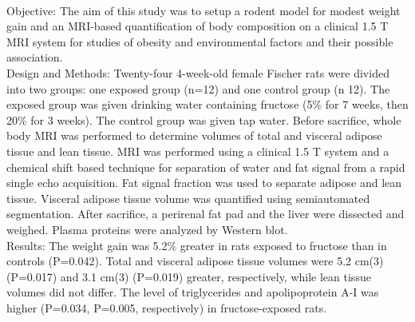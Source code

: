 {{\begin{enumerate}
\\ \aabstract
Objective: The aim of this study was to setup a rodent model for modest weight gain and an MRI-based quantification of body composition on a clinical 1.5 T MRI system for studies of obesity and environmental factors and their possible association.\\ Design and Methods: Twenty-four 4-week-old female Fischer rats were divided into two groups: one exposed group (n=12) and one control group (n 12). The exposed group was given drinking water containing fructose (5\% for 7 weeks, then 20\% for 3 weeks). The control group was given tap water. Before sacrifice, whole body MRI was performed to determine volumes of total and visceral adipose tissue and lean tissue. MRI was performed using a clinical 1.5 T system and a chemical shift based technique for separation of water and fat signal from a rapid single echo acquisition. Fat signal fraction was used to separate adipose and lean tissue. Visceral adipose tissue volume was quantified using semiautomated segmentation. After sacrifice, a perirenal fat pad and the liver were dissected and weighed. Plasma proteins were analyzed by Western blot. \\
Results: The weight gain was 5.2\% greater in rats exposed to fructose than in controls (P=0.042). Total and visceral adipose tissue volumes were 5.2 cm(3) (P=0.017) and 3.1 cm(3) (P=0.019) greater, respectively, while lean tissue volumes did not differ. The level of triglycerides and apolipoprotein A-I was higher (P=0.034, P=0.005, respectively) in fructose-exposed rats.


\end{enumerate}}}
